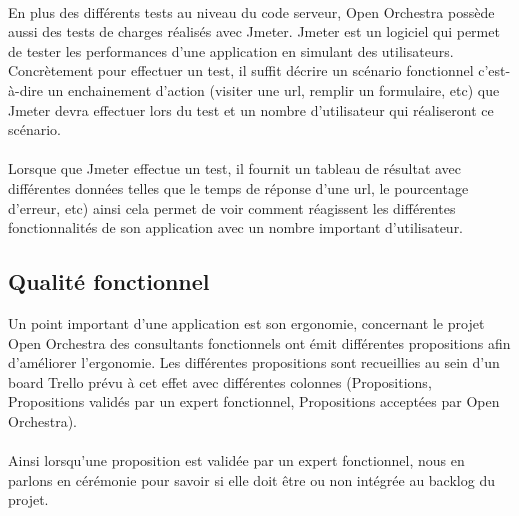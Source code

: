   \paragraph{}
  En plus des différents tests au niveau du code serveur, Open Orchestra possède aussi des tests de charges réalisés avec Jmeter. Jmeter est un logiciel qui permet de tester les performances d'une application en simulant des utilisateurs. Concrètement pour effectuer un test, il suffit décrire un scénario fonctionnel c'est-à-dire un enchainement d'action (visiter une url, remplir un formulaire, etc) que Jmeter devra effectuer lors du test et un nombre d'utilisateur qui réaliseront ce scénario.
  
  \paragraph{}
  Lorsque que Jmeter effectue un test, il fournit un tableau de résultat avec différentes données telles que le temps de réponse d'une url, le pourcentage d'erreur, etc) ainsi cela permet de voir comment réagissent les différentes fonctionnalités de son application avec un nombre important d'utilisateur.
\subsection{Qualité fonctionnel}
Un point important d'une application est son ergonomie, concernant le projet Open Orchestra des consultants fonctionnels ont émit différentes propositions afin d'améliorer l'ergonomie. Les différentes propositions sont recueillies au sein d'un board Trello prévu à cet effet avec différentes colonnes (Propositions, Propositions validés par un expert fonctionnel, Propositions acceptées par Open Orchestra). 
  \paragraph{}
  Ainsi lorsqu'une proposition est validée par un expert fonctionnel, nous en parlons en cérémonie pour savoir si elle doit être ou non intégrée au backlog du projet. 